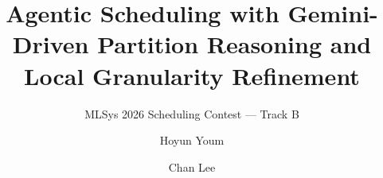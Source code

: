 \documentclass[sigconf,nonacm,9pt]{acmart}
\begin{document}
\title{Agentic Scheduling with Gemini-Driven Partition Reasoning
and Local Granularity Refinement}
\subtitle{MLSys 2026 Scheduling Contest --- Track B}

\author{Hoyun Youm}

\author{Chan Lee}

\maketitle


\end{document}
